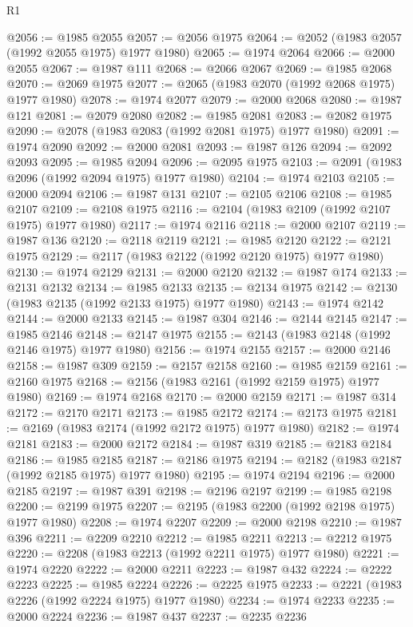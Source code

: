 \begin{lexlean}{R1}
\begin{coremodule}
@2056 := @1985 @2055
@2057 := @2056 @1975
@2064 := @2052 (@1983 @2057 (@1992 @2055 @1975) @1977 @1980)
@2065 := @1974 @2064
@2066 := @2000 @2055
@2067 := @1987 @111
@2068 := @2066 @2067
@2069 := @1985 @2068
@2070 := @2069 @1975
@2077 := @2065 (@1983 @2070 (@1992 @2068 @1975) @1977 @1980)
@2078 := @1974 @2077
@2079 := @2000 @2068
@2080 := @1987 @121
@2081 := @2079 @2080
@2082 := @1985 @2081
@2083 := @2082 @1975
@2090 := @2078 (@1983 @2083 (@1992 @2081 @1975) @1977 @1980)
@2091 := @1974 @2090
@2092 := @2000 @2081
@2093 := @1987 @126
@2094 := @2092 @2093
@2095 := @1985 @2094
@2096 := @2095 @1975
@2103 := @2091 (@1983 @2096 (@1992 @2094 @1975) @1977 @1980)
@2104 := @1974 @2103
@2105 := @2000 @2094
@2106 := @1987 @131
@2107 := @2105 @2106
@2108 := @1985 @2107
@2109 := @2108 @1975
@2116 := @2104 (@1983 @2109 (@1992 @2107 @1975) @1977 @1980)
@2117 := @1974 @2116
@2118 := @2000 @2107
@2119 := @1987 @136
@2120 := @2118 @2119
@2121 := @1985 @2120
@2122 := @2121 @1975
@2129 := @2117 (@1983 @2122 (@1992 @2120 @1975) @1977 @1980)
@2130 := @1974 @2129
@2131 := @2000 @2120
@2132 := @1987 @174
@2133 := @2131 @2132
@2134 := @1985 @2133
@2135 := @2134 @1975
@2142 := @2130 (@1983 @2135 (@1992 @2133 @1975) @1977 @1980)
@2143 := @1974 @2142
@2144 := @2000 @2133
@2145 := @1987 @304
@2146 := @2144 @2145
@2147 := @1985 @2146
@2148 := @2147 @1975
@2155 := @2143 (@1983 @2148 (@1992 @2146 @1975) @1977 @1980)
@2156 := @1974 @2155
@2157 := @2000 @2146
@2158 := @1987 @309
@2159 := @2157 @2158
@2160 := @1985 @2159
@2161 := @2160 @1975
@2168 := @2156 (@1983 @2161 (@1992 @2159 @1975) @1977 @1980)
@2169 := @1974 @2168
@2170 := @2000 @2159
@2171 := @1987 @314
@2172 := @2170 @2171
@2173 := @1985 @2172
@2174 := @2173 @1975
@2181 := @2169 (@1983 @2174 (@1992 @2172 @1975) @1977 @1980)
@2182 := @1974 @2181
@2183 := @2000 @2172
@2184 := @1987 @319
@2185 := @2183 @2184
@2186 := @1985 @2185
@2187 := @2186 @1975
@2194 := @2182 (@1983 @2187 (@1992 @2185 @1975) @1977 @1980)
@2195 := @1974 @2194
@2196 := @2000 @2185
@2197 := @1987 @391
@2198 := @2196 @2197
@2199 := @1985 @2198
@2200 := @2199 @1975
@2207 := @2195 (@1983 @2200 (@1992 @2198 @1975) @1977 @1980)
@2208 := @1974 @2207
@2209 := @2000 @2198
@2210 := @1987 @396
@2211 := @2209 @2210
@2212 := @1985 @2211
@2213 := @2212 @1975
@2220 := @2208 (@1983 @2213 (@1992 @2211 @1975) @1977 @1980)
@2221 := @1974 @2220
@2222 := @2000 @2211
@2223 := @1987 @432
@2224 := @2222 @2223
@2225 := @1985 @2224
@2226 := @2225 @1975
@2233 := @2221 (@1983 @2226 (@1992 @2224 @1975) @1977 @1980)
@2234 := @1974 @2233
@2235 := @2000 @2224
@2236 := @1987 @437
@2237 := @2235 @2236

\end{coremodule}
\end{lexlean}
